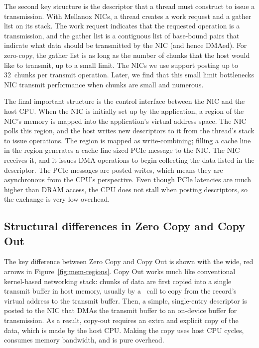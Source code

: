 The second key structure is the descriptor that a thread must construct to
issue a transmission. With Mellanox NICs, a thread creates a work request and a
gather list on its stack. The work request indicates that the requested
operation is a transmission, and the gather list is a contiguous list of
base-bound pairs that indicate what data should be transmitted by the NIC (and
hence DMAed). For zero-copy, the gather list is as long as the number of chunks
that the host would like to transmit, up to a small limit. The NICs we use support
posting up to 32~chunks per transmit operation. Later, we find that this small
limit bottlenecks NIC transmit performance when chunks are small and numerous.

The final important structure is the control interface between the NIC and the
host CPU.  When the NIC is initially set up by the application, a region of the
NIC's memory is mapped into the application's virtual address space. The NIC
polls this region, and the host writes new descriptors to it from the thread's
stack to issue operations. The region is mapped as write-combining; filling a
cache line in the region generates a cache line sized PCIe message to the NIC.
The NIC receives it, and it issues DMA operations to begin collecting the data
listed in the descriptor. The PCIe messages are posted writes, which means they
are asynchronous from the CPU's perspective. Even though PCIe latencies are much
higher than DRAM access, the CPU does not stall when posting descriptors, so the
exchange is very low overhead.

\subsection{Structural differences in Zero Copy and Copy Out}
The key difference between Zero Copy and Copy Out is shown with the wide, red
arrows in Figure~\ref{fig:mem-regions}. Copy Out works much like conventional
kernel-based networking stack: chunks of data are first copied into a single
transmit buffer in host memory, usually by a \memcpy ~call to copy from the record's 
virtual address to the transmit buffer. Then, a simple, single-entry descriptor is
posted to the NIC that DMAs the transmit buffer to an on-device buffer for transmission.
As a result, copy-out requires an extra and explicit copy of the data, which is made
by the host CPU.  Making the copy uses host CPU cycles, consumes memory
bandwidth, and is pure overhead. 



